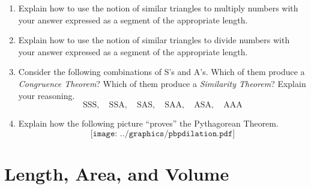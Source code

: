 \begin{problems}
\begin{enumerate}
\item Explain how to use the notion of similar triangles to multiply
  numbers with your answer expressed as a segment of the appropriate
  length.

\item Explain how to use the notion of similar triangles to divide
  numbers with your answer expressed as a segment of the appropriate
  length.


\item Consider the following combinations of S's and A's. Which of
  them produce a \textit{Congruence Theorem}? Which of them produce a
  \textit{Similarity Theorem}? Explain your reasoning.
\[
\text{SSS},\quad \text{SSA},\quad \text{SAS},\quad 
\text{SAA},\quad \text{ASA},\quad \text{AAA} 
\]


\item Explain how the following picture ``proves'' the Pythagorean Theorem.
\[
\texttt{[image: ../graphics/pbpdilation.pdf]}
\]



\end{enumerate}
\end{problems}


\section{Length, Area, and Volume}

